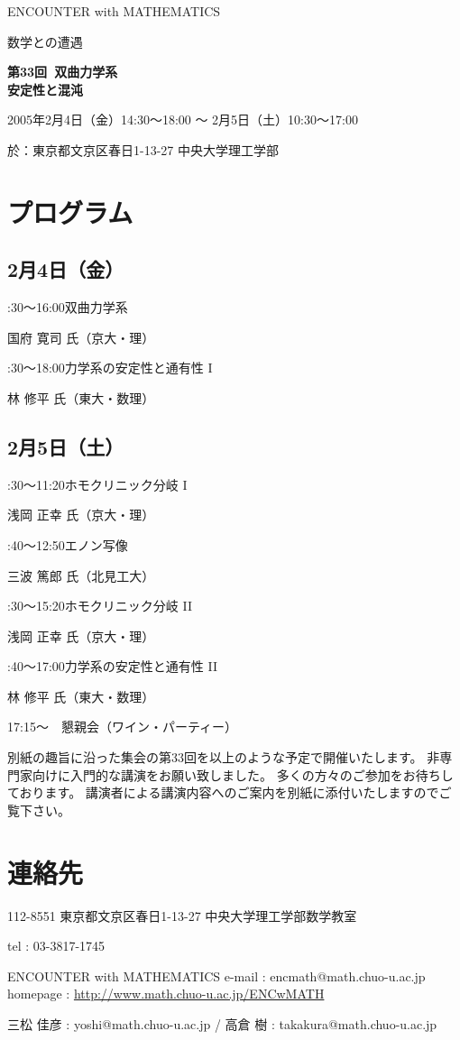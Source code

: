 \documentclass[uplatex,dvipdfmx]{jlreq}
\newcommand{\talk}[3]{%
\noindent
#1\quad #2\par
\hspace*{2em}#3\par\smallskip
}
\newcommand{\EwMnumber}{第33回}
\newcommand{\EwMtitle}{双曲力学系\\[2mm]\large 安定性と混沌}
\newcommand{\EwMdate}{2005年2月4日（金）14:30～18:00 ～ 2月5日（土）10:30～17:00}
\newcommand{\EwMplace}{東京都文京区春日1-13-27 中央大学理工学部}
\newcommand{\EwMtitleblock}{

\vspace*{-5mm}

\begin{center}

{\Large ENCOUNTER with MATHEMATICS}

\vspace{2mm}

{\large 数学との遭遇}

\vspace{4mm}

{\Large \bfseries \EwMnumber\ \EwMtitle}

\vspace{4mm}

\EwMdate

\vspace{2mm}

於：\EwMplace

\end{center}

\vspace{2mm}

}
\begin{document}
\EwMtitleblock


\section*{プログラム}

\subsection*{2月4日（金）}

\talk
{14:30～16:00}
{双曲力学系}
{国府 寛司 氏（京大・理）}

\talk
{16:30～18:00}
{力学系の安定性と通有性 I}
{林 修平 氏（東大・数理）}

\subsection*{2月5日（土）}

\talk
{10:30～11:20}
{ホモクリニック分岐 I}
{浅岡 正幸 氏（京大・理）}

\talk
{11:40～12:50}
{エノン写像}
{三波 篤郎 氏（北見工大）}

\talk
{14:30～15:20}
{ホモクリニック分岐 II}
{浅岡 正幸 氏（京大・理）}

\talk
{15:40～17:00}
{力学系の安定性と通有性 II}
{林 修平 氏（東大・数理）}

\bigskip

17:15～　懇親会（ワイン・パーティー）


\bigskip

別紙の趣旨に沿った集会の第33回を以上のような予定で開催いたします。  
非専門家向けに入門的な講演をお願い致しました。  
多くの方々のご参加をお待ちしております。  
講演者による講演内容へのご案内を別紙に添付いたしますのでご覧下さい。


\section*{連絡先}

112-8551 東京都文京区春日1-13-27 中央大学理工学部数学教室 

tel : 03-3817-1745  

ENCOUNTER with MATHEMATICS  
e-mail : encmath@math.chuo-u.ac.jp  
homepage : \url{http://www.math.chuo-u.ac.jp/ENCwMATH}  

三松 佳彦 : yoshi@math.chuo-u.ac.jp / 高倉 樹 : takakura@math.chuo-u.ac.jp
\end{document}
